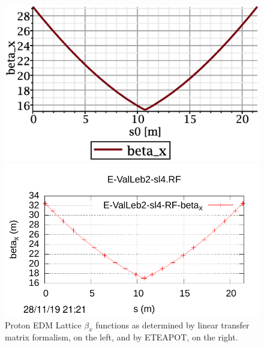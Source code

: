 \documentclass[12]{article}
\begin{document}
\begin{figure}[h]
\begin{minipage}{0.5\linewidth}
\centering
\includegraphics[scale=0.4]{betax_1cell.eps}
\end{minipage}
\begin{minipage}{0.5\linewidth}
\centering
\includegraphics[scale=0.7]{E-ValLeb2-sl4-RF-betax.pdf}
\end{minipage}
\caption{\label{WollnikVsETEAPOT-x}Proton EDM Lattice $\beta_x$ functions as determined by
linear transfer matrix formalism, on the left, and by ETEAPOT,
on the right.}
\end{figure}
\end{document}
